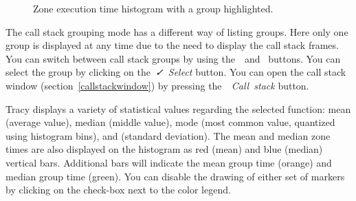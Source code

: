 \documentclass[hidelinks,titlepage,a4paper,twoside]{article}
\begin{document}
\begin{figure}[h]
\centering{}
\caption{Zone execution time histogram with a group highlighted.}
\label{findzonehistogramgroup}
\end{figure}

The call stack grouping mode has a different way of listing groups. Here only one group is displayed at any time due to the need to display the call stack frames. You can switch between call stack groups by using the~\faCaretLeft{}~and~\faCaretRight{} buttons. You can select the group by clicking on the~\emph{\faCheck{}~Select} button. You can open the call stack window (section~\ref{callstackwindow}) by pressing the~\emph{\faAlignJustify{}~Call~stack} button.

Tracy displays a variety of statistical values regarding the selected function: mean (average value), median (middle value), mode (most common value, quantized using histogram bins), and \textsigma{} (standard deviation). The mean and median zone times are also displayed on the histogram as red (mean) and blue (median) vertical bars. Additional bars will indicate the mean group time (orange) and median group time (green). You can disable the drawing of either set of markers by clicking on the check-box next to the color legend.
\end{document}
